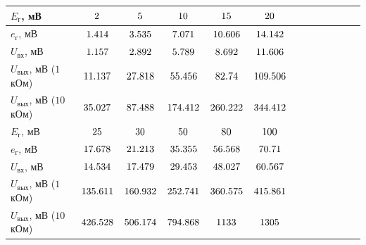 \documentclass[12pt,a4paper]{article}
\def\EgOne{\fpeval{2 * 10^{-3}}} %
\def\EgTwo{\fpeval{5 * 10^{-3}}}
\def\EgThree{\fpeval{10 * 10^{-3}}}
\def\EgFour{\fpeval{15 * 10^{-3}}}
\def\EgFive{\fpeval{20 * 10^{-3}}}
\def\EgSix{\fpeval{25 * 10^{-3}}}
\def\EgSeven{\fpeval{30 * 10^{-3}}}
\def\EgEight{\fpeval{50 * 10^{-3}}}
\def\EgNine{\fpeval{80 * 10^{-3}}}
\def\EgTen{\fpeval{100 * 10^{-3}}}
\def\egOne  {\fpeval{1.414 * 10^(-3)}} %
\def\egTwo  {\fpeval{3.535 * 10^(-3)}}
\def\egThree{\fpeval{7.071 * 10^(-3)}}
\def\egFour {\fpeval{10.606 * 10^(-3)}}
\def\egFive {\fpeval{14.142 * 10^(-3)}}
\def\egSix  {\fpeval{17.678 * 10^(-3)}}
\def\egSeven{\fpeval{21.213 * 10^(-3)}}
\def\egEight{\fpeval{35.355 * 10^(-3)}}
\def\egNine {\fpeval{56.568 * 10^(-3)}}
\def\egTen  {\fpeval{70.710 * 10^(-3)}}
\def\UinOne  {\fpeval{1.157 * 10^(-3)}} %
\def\UinTwo  {\fpeval{2.892 * 10^(-3)}}
\def\UinThree{\fpeval{5.789 * 10^(-3)}}
\def\UinFour {\fpeval{8.692 * 10^(-3)}}
\def\UinFive {\fpeval{11.606 * 10^(-3)}}
\def\UinSix  {\fpeval{14.534 * 10^(-3)}}
\def\UinSeven{\fpeval{17.479 * 10^(-3)}}
\def\UinEight{\fpeval{29.453 * 10^(-3)}}
\def\UinNine {\fpeval{48.027 * 10^(-3)}}
\def\UinTen  {\fpeval{60.567 * 10^(-3)}}
\def\UoutOnekOhmOne  {\fpeval{11.137 * 10^(-3)}} %
\def\UoutOnekOhmTwo  {\fpeval{27.818 * 10^(-3)}}
\def\UoutOnekOhmThree{\fpeval{55.456 * 10^(-3)}}
\def\UoutOnekOhmFour {\fpeval{82.740 * 10^(-3)}}
\def\UoutOnekOhmFive {\fpeval{109.506 * 10^(-3)}}
\def\UoutOnekOhmSix  {\fpeval{135.611 * 10^(-3)}}
\def\UoutOnekOhmSeven{\fpeval{160.932 * 10^(-3)}}
\def\UoutOnekOhmEight{\fpeval{252.741 * 10^(-3)}}
\def\UoutOnekOhmNine {\fpeval{360.575 * 10^(-3)}}
\def\UoutOnekOhmTen  {\fpeval{415.861 * 10^(-3)}}
\def\UoutTenkOhmOne  {\fpeval{35.027 * 10^(-3)}} %
\def\UoutTenkOhmTwo  {\fpeval{87.488 * 10^(-3)}}
\def\UoutTenkOhmThree{\fpeval{174.412 * 10^(-3)}}
\def\UoutTenkOhmFour {\fpeval{260.222 * 10^(-3)}}
\def\UoutTenkOhmFive {\fpeval{344.412 * 10^(-3)}}
\def\UoutTenkOhmSix  {\fpeval{426.528 * 10^(-3)}}
\def\UoutTenkOhmSeven{\fpeval{506.174* 10^(-3)}}
\def\UoutTenkOhmEight{\fpeval{794.868 * 10^(-3)}}
\def\UoutTenkOhmNine {\fpeval{1.133}}
\def\UoutTenkOhmTen  {\fpeval{1.305}}
\begin{document}
\noindent\begin{tabularx}{\textwidth}{|p{3cm}|C|C|C|C|C|C|C|C|C|C|C|C|}
	\hline
	\small $E_\text{г}$, мВ & \small $\fpeval{\EgOne * 10^3}$ & \small $\fpeval{\EgTwo * 10^3}$ & \small $\fpeval{\EgThree * 10^3}$ & 
	\small $\fpeval{\EgFour * 10^3}$ & \small $\fpeval{\EgFive * 10^3}$ \\ 
	\hline
	\small $e_\text{г}$, мВ & \small $\fpeval{\egOne * 10^3}$ & \small $\fpeval{\egTwo * 10^3}$ & \small $\fpeval{\egThree * 10^3}$ & 
	\small $\fpeval{\egFour * 10^3}$ & \small $\fpeval{\egFive * 10^3}$ \\
	\small $U_\text{вх}$, мВ & \small $\fpeval{\UinOne * 10^3}$ & \small $\fpeval{\UinTwo * 10^3}$ & \small $\fpeval{\UinThree * 10^3}$ & 
	\small $\fpeval{\UinFour * 10^3}$ & \small $\fpeval{\UinFive * 10^3}$ \\
	\small $U_\text{вых}$, мВ ($1$ кОм) & \small $\fpeval{\UoutOnekOhmOne * 10^3}$ & \small $\fpeval{\UoutOnekOhmTwo * 10^3}$ & \small $\fpeval{\UoutOnekOhmThree * 10^3}$ &
	\small $\fpeval{\UoutOnekOhmFour * 10^3}$ & \small $\fpeval{\UoutOnekOhmFive * 10^3}$ \\
	\small $U_\text{вых}$, мВ ($10$ кОм) & \small $\fpeval{\UoutTenkOhmOne * 10^3}$ & \small $\fpeval{\UoutTenkOhmTwo * 10^3}$ & \small $\fpeval{\UoutTenkOhmThree * 10^3}$ & 
	\small $\fpeval{\UoutTenkOhmFour * 10^3}$ & \small $\fpeval{\UoutTenkOhmFive * 10^3}$ \\
	\hline
	\small $E_\text{г}$, мВ & \small $\fpeval{\EgSix * 10^3}$ & 
	\small $\fpeval{\EgSeven * 10^3}$ & \small $\fpeval{\EgEight * 10^3}$ & \small $\fpeval{\EgNine * 10^3}$ & 
	\small $\fpeval{\EgTen * 10^3}$ \\ 
	\hline
	\small $e_\text{г}$, мВ & \small $\fpeval{\egSix * 10^3}$ & \small $\fpeval{\egSeven * 10^3}$ & 
	\small $\fpeval{\egEight * 10^3}$ & \small $\fpeval{\egNine * 10^3}$ & \small $\fpeval{\egTen * 10^3}$ \\
	\small $U_\text{вх}$, мВ & \small $\fpeval{\UinSix * 10^3}$ & \small $\fpeval{\UinSeven * 10^3}$ & \small $\fpeval{\UinEight * 10^3}$ & 
	\small $\fpeval{\UinNine * 10^3}$ & \small $\fpeval{\UinTen * 10^3}$ \\
	\small $U_\text{вых}$, мВ ($1$ кОм) & \small $\fpeval{\UoutOnekOhmSix * 10^3}$ & \small $\fpeval{\UoutOnekOhmSeven * 10^3}$ & \small $\fpeval{\UoutOnekOhmEight * 10^3}$ & 
	\small $\fpeval{\UoutOnekOhmNine * 10^3}$ & \small $\fpeval{\UoutOnekOhmTen * 10^3}$ \\
	\small $U_\text{вых}$, мВ ($10$ кОм) & \small $\fpeval{\UoutTenkOhmSix * 10^3}$ & \small $\fpeval{\UoutTenkOhmSeven * 10^3}$ & \small $\fpeval{\UoutTenkOhmEight * 10^3}$ & 
	\small $\fpeval{\UoutTenkOhmNine * 10^3}$ & \small $\fpeval{\UoutTenkOhmTen * 10^3}$ \\
	\hline
\end{tabularx}
\end{document}

